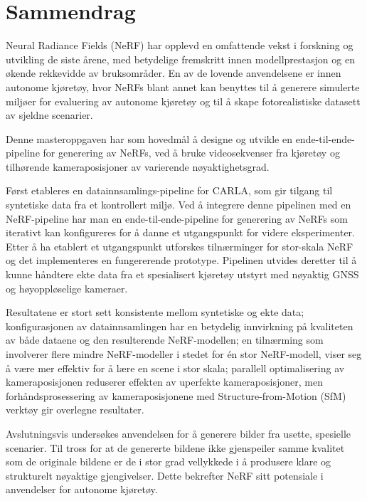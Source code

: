 \chapter*{Sammendrag}

Neural Radiance Fields (NeRF) har opplevd en omfattende vekst i forskning og utvikling de siste årene, med betydelige fremskritt innen modellprestasjon og en økende rekkevidde av bruksområder. En av de lovende anvendelsene er innen autonome kjøretøy, hvor NeRFs blant annet kan benyttes til å generere simulerte miljøer for evaluering av autonome kjøretøy og til å skape fotorealistiske datasett av sjeldne scenarier.

Denne masteroppgaven har som hovedmål å designe og utvikle en ende-til-ende-pipeline for generering av NeRFs, ved å bruke videosekvenser fra kjøretøy og tilhørende kameraposisjoner av varierende nøyaktighetsgrad. 

Først etableres en datainnsamlings-pipeline for CARLA, som gir tilgang til syntetiske data fra et kontrollert miljø. Ved å integrere denne pipelinen med en NeRF-pipeline har man en ende-til-ende-pipeline for generering av NeRFs som iterativt kan konfigureres for å danne et utgangspunkt for videre eksperimenter. Etter å ha etablert et utgangspunkt utforskes tilnærminger for stor-skala NeRF og det implementeres en fungererende prototype. Pipelinen utvides deretter til å kunne håndtere ekte data fra et spesialisert kjøretøy utstyrt med nøyaktig GNSS og høyoppløselige kameraer.

Resultatene er stort sett konsistente mellom syntetiske og ekte data; konfigurasjonen av datainnsamlingen har en betydelig innvirkning på kvaliteten av både dataene og den resulterende NeRF-modellen; en tilnærming som involverer flere mindre NeRF-modeller i stedet for én stor NeRF-modell, viser seg å være mer effektiv for å lære en scene i stor skala; parallell optimalisering av kameraposisjonen reduserer effekten av uperfekte kameraposisjoner, men forhåndsprosessering av kameraposisjonene med Structure-from-Motion (SfM) verktøy gir overlegne resultater.

Avslutningsvis undersøkes anvendelsen for å generere bilder fra usette, spesielle scenarier. Til tross for at de genererte bildene ikke gjenspeiler samme kvalitet som de originale bildene er de i stor grad vellykkede i å produsere klare og strukturelt nøyaktige gjengivelser. Dette bekrefter NeRF sitt potensiale i anvendelser for autonome kjøretøy.




